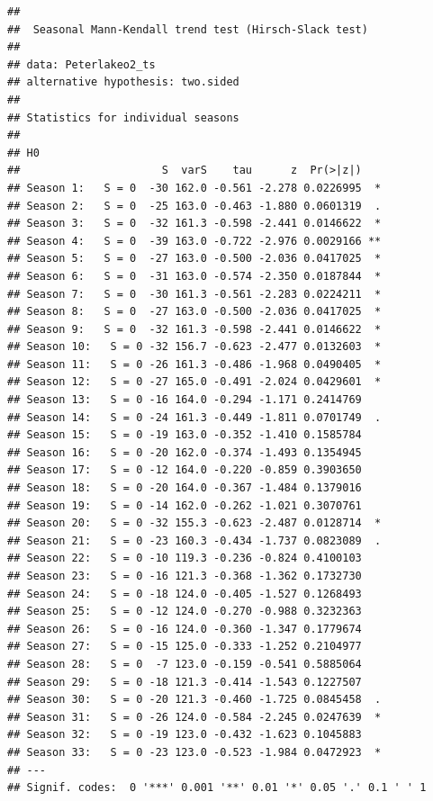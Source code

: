\documentclass[12pt,]{article}
\newenvironment{Shaded}{\begin{snugshade}}{\end{snugshade}}
\newcommand{\KeywordTok}[1]{\textcolor[rgb]{0.13,0.29,0.53}{\textbf{#1}}}
\newcommand{\CommentTok}[1]{\textcolor[rgb]{0.56,0.35,0.01}{\textit{#1}}}
\newcommand{\OperatorTok}[1]{\textcolor[rgb]{0.81,0.36,0.00}{\textbf{#1}}}
\newcommand{\NormalTok}[1]{#1}
\begin{document}
\begin{verbatim}
## 
##  Seasonal Mann-Kendall trend test (Hirsch-Slack test)
## 
## data: Peterlakeo2_ts
## alternative hypothesis: two.sided
## 
## Statistics for individual seasons
## 
## H0
##                      S  varS    tau      z  Pr(>|z|)   
## Season 1:   S = 0  -30 162.0 -0.561 -2.278 0.0226995  *
## Season 2:   S = 0  -25 163.0 -0.463 -1.880 0.0601319  .
## Season 3:   S = 0  -32 161.3 -0.598 -2.441 0.0146622  *
## Season 4:   S = 0  -39 163.0 -0.722 -2.976 0.0029166 **
## Season 5:   S = 0  -27 163.0 -0.500 -2.036 0.0417025  *
## Season 6:   S = 0  -31 163.0 -0.574 -2.350 0.0187844  *
## Season 7:   S = 0  -30 161.3 -0.561 -2.283 0.0224211  *
## Season 8:   S = 0  -27 163.0 -0.500 -2.036 0.0417025  *
## Season 9:   S = 0  -32 161.3 -0.598 -2.441 0.0146622  *
## Season 10:   S = 0 -32 156.7 -0.623 -2.477 0.0132603  *
## Season 11:   S = 0 -26 161.3 -0.486 -1.968 0.0490405  *
## Season 12:   S = 0 -27 165.0 -0.491 -2.024 0.0429601  *
## Season 13:   S = 0 -16 164.0 -0.294 -1.171 0.2414769   
## Season 14:   S = 0 -24 161.3 -0.449 -1.811 0.0701749  .
## Season 15:   S = 0 -19 163.0 -0.352 -1.410 0.1585784   
## Season 16:   S = 0 -20 162.0 -0.374 -1.493 0.1354945   
## Season 17:   S = 0 -12 164.0 -0.220 -0.859 0.3903650   
## Season 18:   S = 0 -20 164.0 -0.367 -1.484 0.1379016   
## Season 19:   S = 0 -14 162.0 -0.262 -1.021 0.3070761   
## Season 20:   S = 0 -32 155.3 -0.623 -2.487 0.0128714  *
## Season 21:   S = 0 -23 160.3 -0.434 -1.737 0.0823089  .
## Season 22:   S = 0 -10 119.3 -0.236 -0.824 0.4100103   
## Season 23:   S = 0 -16 121.3 -0.368 -1.362 0.1732730   
## Season 24:   S = 0 -18 124.0 -0.405 -1.527 0.1268493   
## Season 25:   S = 0 -12 124.0 -0.270 -0.988 0.3232363   
## Season 26:   S = 0 -16 124.0 -0.360 -1.347 0.1779674   
## Season 27:   S = 0 -15 125.0 -0.333 -1.252 0.2104977   
## Season 28:   S = 0  -7 123.0 -0.159 -0.541 0.5885064   
## Season 29:   S = 0 -18 121.3 -0.414 -1.543 0.1227507   
## Season 30:   S = 0 -20 121.3 -0.460 -1.725 0.0845458  .
## Season 31:   S = 0 -26 124.0 -0.584 -2.245 0.0247639  *
## Season 32:   S = 0 -19 123.0 -0.432 -1.623 0.1045883   
## Season 33:   S = 0 -23 123.0 -0.523 -1.984 0.0472923  *
## ---
## Signif. codes:  0 '***' 0.001 '**' 0.01 '*' 0.05 '.' 0.1 ' ' 1
\end{verbatim}

\begin{Shaded}
\end{Shaded}
\end{document}
